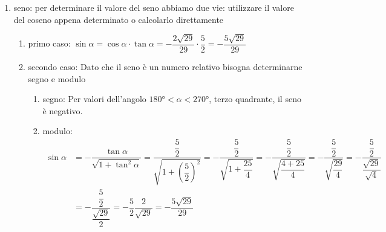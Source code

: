 \begin{table}[H]
\begin{enumerate}
\begin{enumerate}
\begin{enumerate}
		\end{enumerate}
		\item seno: per determinare il valore del seno abbiamo due vie: utilizzare il valore del coseno appena determinato o calcolarlo direttamente 
		\begin{enumerate}
			\item primo caso: $\sin\alpha=\cos\alpha\cdot\tan\alpha=-\dfrac{2\sqrt{29}}{29}\cdot\dfrac{5}{2}=-\dfrac{5\sqrt{29}}{29}$
			\item secondo caso: Dato che il seno è un numero relativo bisogna determinarne segno e modulo
			\begin{enumerate}
				\item segno:  Per valori dell'angolo  $\ang{180}<\alpha<\ang{270}$, terzo quadrante, il seno è negativo.
				\item modulo:
				\begin{align*}
				\sin\alpha&=-\dfrac{\tan\alpha}{\sqrt{1+\tan^2\alpha}}
				=\dfrac{\dfrac{5}{2}}{\sqrt{1+\left(\dfrac{5}{2}\right)^2}}
				=-\dfrac{\dfrac{5}{2}}{\sqrt{1+\dfrac{25}{4}}}
				=-\dfrac{\dfrac{5}{2}}{\sqrt{\dfrac{4+25}{4}}}
				=-\dfrac{\dfrac{5}{2}}{\sqrt{\dfrac{29}{4}}}
				=-\dfrac{\dfrac{5}{2}}{\dfrac{\sqrt{29}}{\sqrt{4}}}\\
				&=-\dfrac{\dfrac{5}{2}}{\dfrac{\sqrt{29}}{2}}
				=-\dfrac{5}{2}\dfrac{2}{\sqrt{29}}
				=-\dfrac{5\sqrt{29}}{29}
				\end{align*} %
			\end{enumerate}
		\end{enumerate}
	\end{enumerate}
\end{enumerate}
\end{table}

